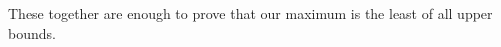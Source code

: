 These together are enough to prove that our maximum is
the least of all upper bounds.
\begin{code}%
\>[0][@{}l@{\AgdaIndent{1}}]%
\>[2]\AgdaSpace{}%
\AgdaSymbol{:}\AgdaSpace{}%
\AgdaSpace{}%
\AgdaSymbol{\{}\AgdaSpace{}%
\AgdaSpace{}%
\AgdaSymbol{\}}\AgdaSpace{}%
\AgdaSpace{}%
\AgdaSpace{}%
\AgdaSpace{}%
\AgdaSpace{}%
\AgdaSpace{}%
\AgdaSpace{}%
\AgdaSpace{}%
\AgdaSpace{}%
\AgdaSpace{}%
\AgdaSpace{}%
\AgdaSpace{}%
\AgdaSpace{}%
\AgdaSpace{}%
\<%
\\
%
\>[2]\AgdaSpace{}%
\AgdaSpace{}%
\AgdaSpace{}%
\AgdaSymbol{=}\AgdaSpace{}%
\AgdaSpace{}%
\AgdaSpace{}%
\AgdaSpace{}%
\AgdaSpace{}%
\<%
\end{code}

